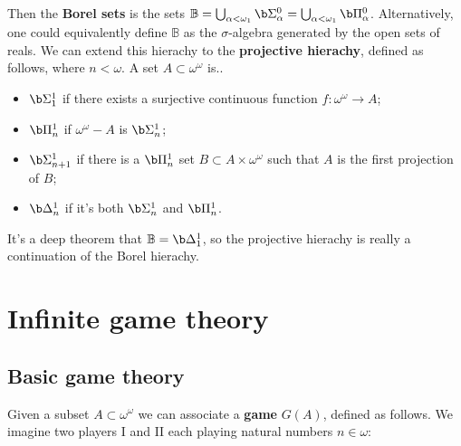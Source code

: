 Then the \textbf{Borel sets} is the sets $\mathbb B=\bigcup_{\alpha<\omega_1}\b\Sigma^0_\alpha=\bigcup_{\alpha<\omega_1}\b\Pi^0_\alpha$. Alternatively, one could equivalently define $\mathbb B$ as the $\sigma$-algebra generated by the open sets of reals. We can extend this hierachy to the \textbf{projective hierachy}, defined as follows, where $n<\omega$. A set $A\subset\omega^\omega$ is..
\begin{itemize}
\item $\b\Sigma^1_1$ if there exists a surjective continuous function $f:\omega^\omega\to A$;
\item $\b\Pi^1_n$ if $\omega^\omega-A$ is $\b\Sigma^1_n$;
\item $\b\Sigma^1_{n+1}$ if there is a $\b\Pi^1_n$ set $B\subset A\times\omega^\omega$ such that $A$ is the first projection of $B$;
\item $\b\Delta^1_n$ if it's both $\b\Sigma^1_n$ and $\b\Pi^1_n$.\\
\end{itemize}

It's a deep theorem that $\mathbb B=\b\Delta^1_1$, so the projective hierachy is really a continuation of the Borel hierachy.


\pagebreak
\section{Infinite game theory}

\subsection{Basic game theory}

Given a subset $A\subset\omega^\omega$ we can associate a \textbf{game} $G(A)$, defined as follows. We imagine two players I and II each playing natural numbers $n\in\omega$:
\game{x_0}{x_1}{x_2}{x_3}{x_4}{x_5}{\cdots}{\cdots}

